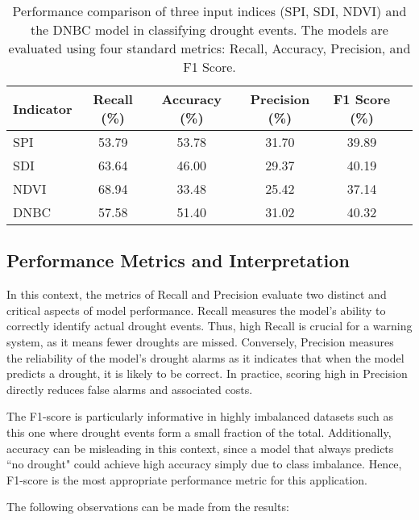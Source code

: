 \begin{table}[!h]
    \centering
    \caption[Performance Metrics of Input Indices \& DNBC]{Performance comparison of three input indices (SPI, SDI, NDVI) and the DNBC model in classifying drought events. The models are evaluated using four standard metrics: Recall, Accuracy, Precision, and F1 Score.}
    \label{tbl:performance_metrics}
    \begin{tabular}{lccccc}
        \toprule
        Indicator & Recall (\%) & Accuracy (\%) & Precision (\%)  & F1 Score (\%) \\
        \midrule
        SPI       & 53.79   & 53.78         & 31.70           & 39.89         \\
        SDI       & 63.64   & 46.00         & 29.37           & 40.19         \\
        NDVI      & 68.94   & 33.48         & 25.42           & 37.14         \\
        DNBC      & 57.58   & 51.40         & 31.02           & 40.32         \\
        \bottomrule
    \end{tabular}
\end{table}

\subsection{Performance Metrics and Interpretation}

In this context, the metrics of Recall and Precision evaluate two distinct and critical aspects of model performance. Recall measures the model's ability to correctly identify actual drought events. Thus, high Recall is crucial for a warning system, as it means fewer droughts are missed. Conversely, Precision measures the reliability of the model's drought alarms as it indicates that when the model predicts a drought, it is likely to be correct. In practice, scoring high in Precision directly reduces false alarms and associated costs.

The F1-score is particularly informative in highly imbalanced datasets such as this one where drought events form a small fraction of the total. Additionally, accuracy can be misleading in this context, since a model that always predicts ``no drought" could achieve high accuracy simply due to class imbalance. Hence, F1-score is the most appropriate performance metric for this application.

The following observations can be made from the results:

